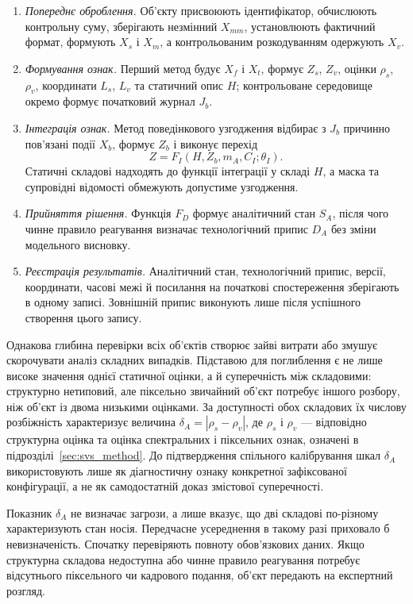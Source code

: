 \begin{enumerate}
\item \textit{Попереднє оброблення.} Об’єкту присвоюють ідентифікатор, обчислюють контрольну суму, зберігають незмінний $X_{mm}$, установлюють фактичний формат, формують $X_s$ і $X_m$, а контрольованим розкодуванням одержують $X_v$.
\item \textit{Формування ознак.} Перший метод будує $X_f$ і $X_t$, формує $Z_s$, $Z_v$, оцінки $\rho_s$, $\rho_v$, координати $L_s$, $L_v$ та статичний опис $H$; контрольоване середовище окремо формує початковий журнал $J_b$.
\item \textit{Інтеграція ознак.} Метод поведінкового узгодження відбирає з $J_b$ причинно пов’язані події $X_b$, формує $Z_b$ і виконує перехід
\[
Z=F_I(H,Z_b,m_A,C_I;\theta_I).
\]
Статичні складові надходять до функції інтеграції у складі $H$, а маска та супровідні відомості обмежують допустиме узгодження.
\item \textit{Прийняття рішення.} Функція $F_D$ формує аналітичний стан $S_A$, після чого чинне правило реагування визначає технологічний припис $D_A$ без зміни модельного висновку.
\item \textit{Реєстрація результатів.} Аналітичний стан, технологічний припис, версії, координати, часові межі й посилання на початкові спостереження зберігають в одному записі. Зовнішній припис виконують лише після успішного створення цього запису.
\end{enumerate}

Однакова глибина перевірки всіх об’єктів створює зайві витрати або змушує скорочувати аналіз складних випадків. Підставою для поглиблення є не лише високе значення однієї статичної оцінки, а й суперечність між складовими: структурно нетиповий, але піксельно звичайний об’єкт потребує іншого розбору, ніж об’єкт із двома низькими оцінками. За доступності обох складових їх числову розбіжність характеризує величина $\delta_A=|\rho_s-\rho_v|$, де $\rho_s$ і $\rho_v$ --- відповідно структурна оцінка та оцінка спектральних і піксельних ознак, означені в підрозділі~\ref{sec:svs_method}. До підтвердження спільного калібрування шкал $\delta_A$ використовують лише як діагностичну ознаку конкретної зафіксованої конфігурації, а не як самодостатній доказ змістової суперечності.

Показник $\delta_A$ не визначає загрози, а лише вказує, що дві складові по-різному характеризують стан носія. Передчасне усереднення в такому разі приховало б невизначеність. Спочатку перевіряють повноту обов’язкових даних. Якщо структурна складова недоступна або чинне правило реагування потребує відсутнього піксельного чи кадрового подання, об’єкт передають на експертний розгляд.

